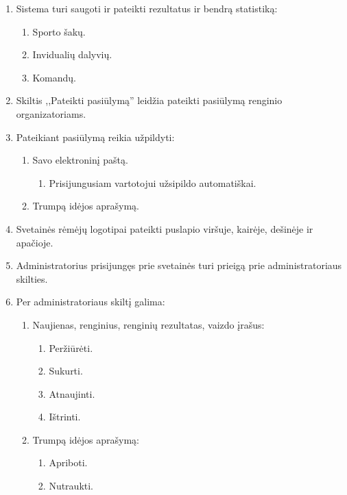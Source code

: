 \documentclass{VUMIFPSkursinis}
\begin{document}
\begin{enumerate}[label=\textbf{FR\arabic*}]
                \item Sistema turi saugoti ir pateikti rezultatus ir bendrą statistiką:
					\begin{enumerate}[label*=\textbf{.\arabic*}]
						\item Sporto šakų.
						\item Invidualių dalyvių.
						\item Komandų.
					\end{enumerate}
				\item Skiltis ,,Pateikti pasiūlymą'' leidžia pateikti pasiūlymą renginio organizatoriams.
				\item Pateikiant pasiūlymą reikia užpildyti:
					\begin{enumerate}[label*=\textbf{.\arabic*}]
						\item Savo elektroninį paštą.
						    \begin{enumerate}[label*=\textbf{.\arabic*}]
						        \item Prisijungusiam vartotojui užsipildo automatiškai.
						    \end{enumerate}
						\item Trumpą idėjos aprašymą.
					\end{enumerate}
				\item Svetainės rėmėjų logotipai pateikti puslapio viršuje, kairėje, dešinėje ir apačioje.
				\item Administratorius prisijungęs prie svetainės turi prieigą prie administratoriaus skilties.
				\item Per administratoriaus skiltį galima:
					\begin{enumerate}[label*=\textbf{.\arabic*}]
						\item Naujienas, renginius, renginių rezultatas, vaizdo įrašus:
						    \begin{enumerate}[label*=\textbf{.\arabic*}]
						        \item Peržiūrėti.
						        \item Sukurti.
						        \item Atnaujinti.
						        \item Ištrinti.
						    \end{enumerate}
						\item Trumpą idėjos aprašymą:
                            \begin{enumerate}[label*=\textbf{.\arabic*}]
						        \item Apriboti.
						        \item Nutraukti.

\end{enumerate}
\end{enumerate}
\end{enumerate}
\end{document}
